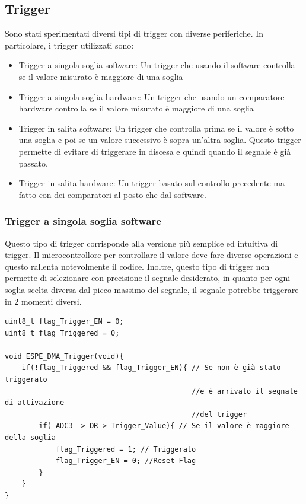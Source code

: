 \subsection{Trigger}
Sono stati sperimentati diversi tipi di trigger con diverse periferiche. In particolare, i trigger utilizzati sono:
\begin{itemize}
    \item Trigger a singola soglia software: Un trigger che usando il software controlla se il valore misurato è maggiore di una soglia
    \item Trigger a singola soglia hardware: Un trigger che usando un comparatore hardware controlla se il valore misurato è maggiore di una soglia
    \item Trigger in salita software: Un trigger che controlla prima se il valore è sotto una soglia e poi se un valore successivo è sopra un'altra soglia. Questo trigger permette di evitare di triggerare in discesa e quindi quando il segnale è già passato.
    \item Trigger in salita hardware: Un trigger basato sul controllo precedente ma fatto con dei comparatori al posto che dal software.
\end{itemize}

\subsubsection{Trigger a singola soglia software}
Questo tipo di trigger corrisponde alla versione più semplice ed intuitiva di trigger. Il microcontrollore per controllare il valore deve fare diverse operazioni e questo rallenta notevolmente il codice. Inoltre, questo tipo di trigger non permette di selezionare con precisione il segnale desiderato, in quanto per ogni soglia scelta diversa dal picco massimo del segnale, il segnale potrebbe triggerare in 2 momenti diversi.

\noindent
\begin{verbatim}
uint8_t flag_Trigger_EN = 0;
uint8_t flag_Triggered = 0;

void ESPE_DMA_Trigger(void){
    if(!flag_Triggered && flag_Trigger_EN){ // Se non è già stato triggerato
                                            //e è arrivato il segnale di attivazione
                                            //del trigger
        if( ADC3 -> DR > Trigger_Value){ // Se il valore è maggiore della soglia
            flag_Triggered = 1; // Triggerato
            flag_Trigger_EN = 0; //Reset Flag
        }
    }
}
\end{verbatim}

